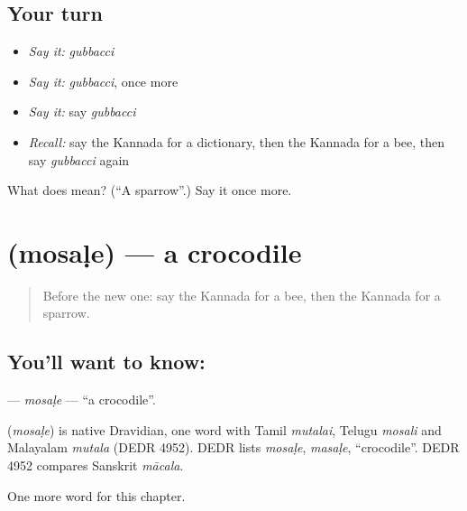 \subsection*{Your turn}
\begin{itemize}
\raggedright
  \item \emph{Say it:} \emph{gubbacci}
  \item \emph{Say it:} \emph{gubbacci}, once more
  \item \emph{Say it:} say \emph{gubbacci}
  \item \emph{Recall:} say the Kannada for a dictionary, then the Kannada for a bee, then say \emph{gubbacci} again
\end{itemize}

\begin{tcolorbox}[breakable,colback=teal!4,colframe=teal!35!black,title={Before you move on}]
What does  mean? (\textquotedblleft{}A sparrow\textquotedblright{}.) Say it once more.
\end{tcolorbox}
\section[\texorpdfstring{\kn{ಮೊಸಳೆ} (mosaḷe)}{ಮೊಸಳೆ (mosaḷe)}]{ (mosaḷe) — a crocodile}

\label{lesson:KA-C297-mosale}



\begin{quote}
Before the new one: say the Kannada for a bee, then the Kannada for a sparrow.
\end{quote}

\subsection*{You'll want to know: }
\textbf{} — \emph{mosaḷe} — \textquotedblleft{}a crocodile\textquotedblright{}.

\begin{cousinweb}
\textbf{} (\emph{mosaḷe}) is native Dravidian, one word with Tamil \emph{mutalai}, Telugu \emph{mosali} and Malayalam \emph{mutala} (DEDR 4952). DEDR lists \emph{mosaḷe}, \emph{masaḷe}, \textquotedblleft{}crocodile\textquotedblright{}. DEDR 4952 compares Sanskrit \emph{mācala}.
\end{cousinweb}

\begin{grammarlens}[title={What you've built}]
One more word for this chapter.
\end{grammarlens}

